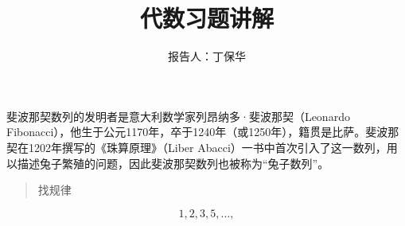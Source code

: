 \documentclass[aspectratio=169]{ctexbeamer}
\begin{document}
\title[底部简明标题]{
代数习题讲解
}
\author[底部演讲者]{报告人：丁保华}
\begin{frame}
斐波那契数列的发明者是意大利数学家‌列昂纳多·斐波那契（Leonardo Fibonacci），他生于公元1170年，卒于1240年（或1250年），籍贯是比萨。斐波那契在1202年撰写的《‌珠算原理》（Liber Abacci）一书中首次引入了这一数列，用以描述兔子繁殖的问题，因此斐波那契数列也被称为“兔子数列”。
\end{frame}

\begin{frame}
\begin{quote}
找规律
\end{quote}
\[
1,  2, 3, 5, \dots,
\]
\end{frame}
\end{document}
